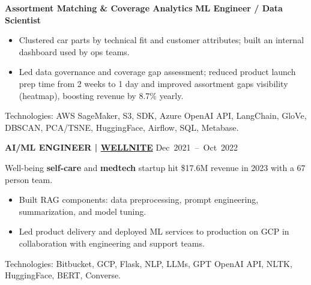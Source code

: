 \documentclass[a4paper,12pt]{article}
\begin{document}
\noindent\textbf{Assortment Matching \& Coverage Analytics}
\hfill \textbf{ML Engineer / Data Scientist}\par
\begin{itemize}[nosep,leftmargin=1em,itemsep=2pt]
  \item[--] Clustered car parts by technical fit and customer attributes; built an internal dashboard used by ops teams.
  \item[--] Led data governance and coverage gap assessment; reduced product launch prep time from 2 weeks to 1 day and improved assortment gaps visibility (heatmap), boosting revenue by 8.7\% yearly.
\end{itemize}

\footnotesize Technologies: AWS SageMaker, S3, SDK, Azure OpenAI API, LangChain, GloVe, DBSCAN, PCA/TSNE, HuggingFace, Airflow, SQL, Metabase.\par
\vspace{16pt}




\noindent\textbf{AI/ML ENGINEER | \href{https://wellnite.com}{WELLNITE}}   \hfill{\mbox{Dec 2021 -- Oct 2022}} \par
\footnotesize Well-being \textbf{self-care} and \textbf{medtech} startup hit \$17.6M revenue in 2023 with a 67 person team.\par
\begin{itemize}[nosep,leftmargin=1em,itemsep=3pt]
  \item[--] Built RAG components: data preprocessing, prompt engineering, summarization, and model tuning.
  \item[--] Led product delivery and deployed ML services to production on GCP in collaboration with engineering and support teams.
\end{itemize}
\footnotesize Technologies: Bitbucket, GCP, Flask, NLP, LLMs, GPT OpenAI API, NLTK, HuggingFace, BERT, Converse.\par
\vspace{6pt}
\end{document}
